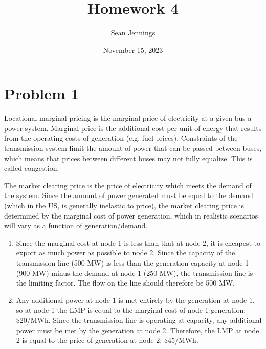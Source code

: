 \documentclass{homework}
\title{Homework 4}
\author{Sean Jennings}
\date{November 15, 2023}
\begin{document}
\maketitle

\newcommand{\dolperMWh}{\text{ \$/MWh}}
\newcommand{\perh}{\text{ /hr}}

\section{Problem 1}
\begin{letterenum}
\item Locational marginal pricing is the marginal price of electricity at a given bus a power
    system. Marginal price is the additional cost per unit of energy that results from
    the operating costs of generation (e.g. fuel prices). Constraints of the transmission
    system limit the amount of power that can be passed between buses, which means that
    prices between different buses may not fully equalize. This is called congestion.

\item The market clearing price is the price of electricity which meets the 
    demand of the system. Since the amount of power generated
    must be equal to the demand (which in the US, is generally inelastic to price),
    the market clearing price is determined by the marginal cost of power generation,
    which in realistic scenarios will vary as a function of generation/demand.
\item
    \begin{enumerate}
    
    \item Since the marginal cost at node 1 is less than that at node 2, it is
    cheapest to export as much power as possible to node 2. Since the capacity
    of the transmission line (500 MW) is less than the generation capacity at node 1
    (900 MW) minus the demand at node 1 (250 MW), the transmission line is the
    limiting factor. The flow on the line should therefore be 500 MW.

    \item Any additional power at node 1 is met entirely by the generation at node 1,
        so at node 1 the LMP is equal to the marginal cost of node 1 generation:
        \$20/MWh. Since the transmission line is operating at capacity, any additional
        power must be met by the generation at node 2. Therefore, the LMP at node
        2 is equal to the price of generation at node 2: \$45/MWh.


\end{enumerate}
\end{letterenum}
\end{document}
